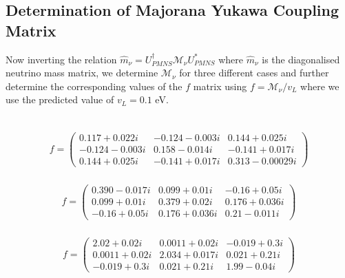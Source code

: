 \documentclass[a4paper,11pt]{article}
\newcommand{\bea}{\begin{eqnarray}}
\newcommand{\eea}{\end{eqnarray}}
\begin{document}
\subsection{Determination of Majorana Yukawa Coupling Matrix} 

Now inverting the relation ${\hat m}_\nu=U_{PMNS}^\dagger {\mathcal M}_\nu U_{PMNS}^*$
where ${\hat m}_\nu$ is the diagonalised neutrino mass matrix, we determine ${\mathcal M}_{\nu}$ for three different cases and further determine the corresponding values of the $f$ matrix using $f={\mathcal M}_\nu/v_L$
where we use the predicted value of $v_L=0.1$ eV.\\ 
\par{}\\
\bea
f =
\begin{pmatrix} 0.117+0.022i & -0.124-0.003i  &   0.144+0.025i\\
-0.124-0.003i  & 0.158-0.014i  & -0.141+0.017i\\ 0.144+0.025i &-0.141+0.017i& 0.313-0.00029i \end{pmatrix}\label{fNH}
\eea
\vspace{0.2cm}
\\
\bea
f =  
\begin{pmatrix} 0.390-0.017i & 0.099+0.01i  &  -0.16+0.05i\\
0.099+0.01i  & 0.379+0.02i  & 0.176+0.036i\\-0.16+0.05i &0.176+0.036i& 0.21-0.011i \end{pmatrix}  \label{fIH}
\eea
{}\\
\bea
 f =
\begin{pmatrix} 2.02+0.02i & 0.0011+0.02i  &  -0.019+0.3i\\
0.0011+0.02i  & 2.034+0.017i  & 0.021+0.21i\\-0.019+0.3i &0.021+0.21i& 1.99-0.04i \end{pmatrix} \label{fQD}
\eea
\end{document}

